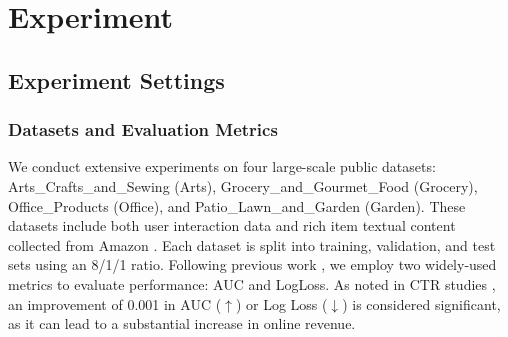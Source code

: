 \chapter{Experiment} %

\label{Chapter4} %


\section{Experiment Settings}

\subsection{Datasets and Evaluation Metrics}
\sloppy
We conduct extensive experiments on four large-scale public datasets: Arts\_Crafts\_and\_Sewing (Arts), Grocery\_and\_Gourmet\_Food (Grocery), Office\_Products (Office), and Patio\_Lawn\_and\_Garden (Garden). These datasets include both user interaction data and rich item textual content collected from Amazon \cite{ni2019justifying}. Each dataset is split into training, validation, and test sets using an 8/1/1 ratio. Following previous work \cite{guo2024embedding,li2023ctrl,tian2023eulernet,zhang2024towards}, we employ two widely-used metrics to evaluate performance: AUC and LogLoss. As noted in CTR studies \cite{guo2024embedding,li2023ctrl,tian2023eulernet,zhang2024towards}, an improvement of 0.001 in AUC (\(\uparrow\)) or Log Loss (\(\downarrow\)) is considered significant, as it can lead to a substantial increase in online revenue.

